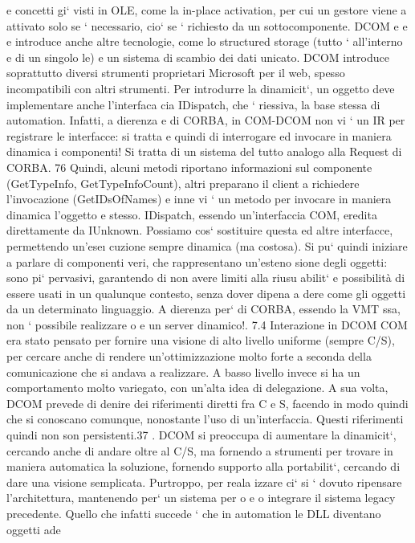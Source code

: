 \documentclass[a4paper,12pt]{article}
\begin{document}
e
concetti gi` visti in OLE, come la in-place activation, per cui un gestore viene
a
attivato solo se ` necessario, cio` se ` richiesto da un sottocomponente. DCOM
e
e e
introduce anche altre tecnologie, come lo structured storage (tutto ` all'interno
e
di un singolo le) e un sistema di scambio dei dati unicato. DCOM introduce
soprattutto diversi strumenti proprietari Microsoft per il web, spesso incompatibili con altri strumenti.
Per introdurre la dinamicit`, un oggetto deve implementare anche l'interfaca
cia IDispatch, che ` riessiva, la base stessa di automation. Infatti, a dierenza
e
di CORBA, in COM-DCOM non vi ` un IR per registrare le interfacce: si tratta
e
quindi di interrogare ed invocare in maniera dinamica i componenti! Si tratta
di un sistema del tutto analogo alla Request di CORBA.
76
\newpage
Quindi, alcuni metodi riportano informazioni sul componente (GetTypeInfo,
GetTypeInfoCount), altri preparano il client a richiedere l'invocazione (GetIDsOfNames) e inne vi ` un metodo per
invocare in maniera dinamica l'oggetto
e
stesso. IDispatch, essendo un'interfaccia COM, eredita direttamente da IUnknown. Possiamo cos` sostituire questa ed
altre interfacce, permettendo un'ese\i{}
cuzione sempre dinamica (ma costosa).
Si pu` quindi iniziare a parlare di componenti veri, che rappresentano un'esteno
sione degli oggetti: sono pi` pervasivi, garantendo di non avere limiti alla riusu
abilit` e possibilità di essere usati in un qualunque contesto, senza dover dipena
a
dere come gli oggetti da un determinato linguaggio.
A dierenza per` di CORBA, essendo la VMT ssa, non ` possibile realizzare
o
e
un server dinamico!.
7.4
Interazione in DCOM
COM era stato pensato per fornire una visione di alto livello uniforme (sempre
C/S), per cercare anche di rendere un'ottimizzazione molto forte a seconda
della comunicazione che si andava a realizzare. A basso livello invece si ha un
comportamento molto variegato, con un'alta idea di delegazione.
A sua volta, DCOM prevede di denire dei riferimenti diretti fra C e S,
facendo in modo quindi che si conoscano comunque, nonostante l'uso di un'interfaccia. Questi riferimenti quindi non son
persistenti.37 . DCOM si preoccupa
di aumentare la dinamicit`, cercando anche di andare oltre al C/S, ma fornendo
a
strumenti per trovare in maniera automatica la soluzione, fornendo supporto
alla portabilit`, cercando di dare una visione semplicata. Purtroppo, per reala
izzare ci` si ` dovuto ripensare l'architettura, mantenendo per` un sistema per
o e
o
integrare il sistema legacy precedente.
Quello che infatti succede ` che in automation le DLL diventano oggetti ade
\end{document}
